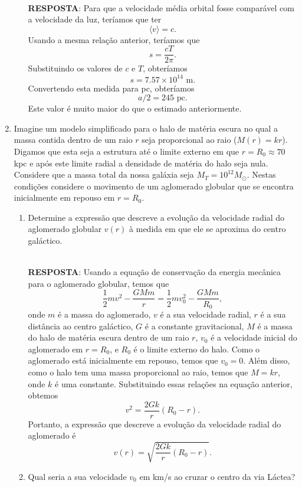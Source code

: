 \documentclass[a4paper,12pt]{article}
\begin{document}
\begin{enumerate}
\begin{enumerate}
\noindent\hrulefill\\\textbf{RESPOSTA}: Para que a velocidade média orbital fosse comparável com a velocidade da luz, teríamos que ter $$\langle v \rangle = c.$$ Usando a mesma relação anterior, teríamos que $$s = \frac{cT}{2\pi}.$$ Substituindo os valores de $c$ e $T$, obteríamos $$s = 7.57 \times 10^{14} \text{ m}.$$ Convertendo esta medida para pc, obteríamos $$a/2 = 245 \text{ pc}.$$ Este valor é muito maior do que o estimado anteriormente.

\end{enumerate}

\noindent\hrulefill

\item Imagine um modelo simplificado para o halo de matéria escura no qual a massa contida dentro de um raio $r$ seja proporcional ao raio ($M(r) = kr$). Digamos que esta seja a estrutura até o limite externo em que $r=R_0 \approx 70$ kpc e após este limite radial a densidade de matéria do halo seja nula. Considere que a massa total da nossa galáxia seja $M_T=10^{12} M_\odot$. Nestas condições considere o movimento de um aglomerado globular que se encontra inicialmente em repouso em $r=R_0$.

\begin{enumerate}
\item Determine a expressão que descreve a evolução da velocidade radial do aglomerado globular $v(r)$ à medida em que ele se aproxima do centro galáctico.

\noindent\hrulefill\\\textbf{RESPOSTA}: Usando a equação de conservação da energia mecânica para o aglomerado globular, temos que
$$ \frac{1}{2}mv^2 - \frac{GMm}{r} = \frac{1}{2}mv_0^2 - \frac{GMm}{R_0}, $$
onde $m$ é a massa do aglomerado, $v$ é a sua velocidade radial, $r$ é a sua distância ao centro galáctico, $G$ é a constante gravitacional, $M$ é a massa do halo de matéria escura dentro de um raio $r$, $v_0$ é a velocidade inicial do aglomerado em $r=R_0$, e $R_0$ é o limite externo do halo. Como o aglomerado está inicialmente em repouso, temos que $v_0=0$. Além disso, como o halo tem uma massa proporcional ao raio, temos que $M=kr$, onde $k$ é uma constante. Substituindo essas relações na equação anterior, obtemos
$$ v^2 = \frac{2Gk}{r}(R_0 - r). $$
Portanto, a expressão que descreve a evolução da velocidade radial do aglomerado é
$$ v(r) = \sqrt{\frac{2Gk}{r}(R_0 - r)}. $$

\noindent\hrulefill

\item Qual seria a sua velocidade $v_0$ em km/s ao cruzar o centro da via Láctea?


\end{enumerate}
\end{enumerate}
\end{document}
